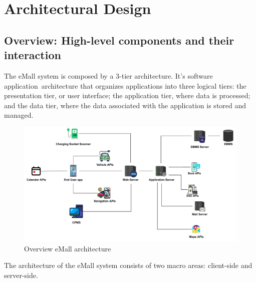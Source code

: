 \chapter{Architectural Design}
\section{Overview: High-level components and their interaction}
The eMall system is composed by a 3-tier architecture. It's software application architecture that organizes applications into three logical tiers: the presentation tier, or user interface; the application tier, where data is processed; and the data tier, where the data associated with the application is stored and managed.
\begin{figure}[H]
    \centering
    \includegraphics[width=\textwidth]{images/3tier.pdf}
    \caption{Overview eMall architecture}
    \label{fig:eMallArchitecture}
\end{figure}
The architecture of the eMall system consists of two macro areas: client-side and server-side.
